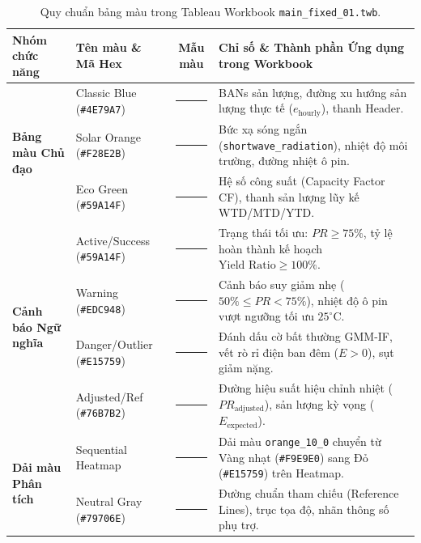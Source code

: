 \documentclass[12pt, a4paper]{report}
\begin{document}
\begin{table}[H]
\centering
\small
\renewcommand{\arraystretch}{1.3}
\begin{tabularx}{\textwidth}{@{} l l c X @{}}
\toprule
\textbf{Nhóm chức năng} & \textbf{Tên màu \& Mã Hex} & \textbf{Mẫu màu} & \textbf{Chỉ số \& Thành phần Ứng dụng trong Workbook} \\
\midrule
\multirow{3}{*}{\textbf{Bảng màu Chủ đạo}} 
& Classic Blue (\texttt{\#4E79A7}) & \textcolor{tblNavy}{\rule{1.2cm}{0.3cm}} & BANs sản lượng, đường xu hướng sản lượng thực tế ($e_{\text{hourly}}$), thanh Header. \\
& Solar Orange (\texttt{\#F28E2B}) & \textcolor{tblOrange}{\rule{1.2cm}{0.3cm}} & Bức xạ sóng ngắn (\texttt{shortwave\_radiation}), nhiệt độ môi trường, đường nhiệt ô pin. \\
& Eco Green (\texttt{\#59A14F}) & \textcolor{tblGreen}{\rule{1.2cm}{0.3cm}} & Hệ số công suất (Capacity Factor CF), thanh sản lượng lũy kế WTD/MTD/YTD. \\
\midrule
\multirow{4}{*}{\textbf{Cảnh báo Ngữ nghĩa}}
& Active/Success (\texttt{\#59A14F}) & \textcolor{tblGreen}{\rule{1.2cm}{0.3cm}} & Trạng thái tối ưu: $PR \ge 75\%$, tỷ lệ hoàn thành kế hoạch $\text{Yield Ratio} \ge 100\%$. \\
& Warning (\texttt{\#EDC948}) & \textcolor{tblYellow}{\rule{1.2cm}{0.3cm}} & Cảnh báo suy giảm nhẹ ($50\% \le PR < 75\%$), nhiệt độ ô pin vượt ngưỡng tối ưu $25^\circ\text{C}$. \\
& Danger/Outlier (\texttt{\#E15759}) & \textcolor{tblRed}{\rule{1.2cm}{0.3cm}} & Đánh dấu cờ bất thường GMM-IF, vết rò rỉ điện ban đêm ($E > 0$), sụt giảm nặng. \\
& Adjusted/Ref (\texttt{\#76B7B2}) & \textcolor{tblTeal}{\rule{1.2cm}{0.3cm}} & Đường hiệu suất hiệu chỉnh nhiệt ($PR_{\text{adjusted}}$), sản lượng kỳ vọng ($E_{\text{expected}}$). \\
\midrule
\multirow{2}{*}{\textbf{Dải màu Phân tích}}
& Sequential Heatmap & \textcolor{tblSeqWarm}{\rule{1.2cm}{0.3cm}} & Dải màu \texttt{orange\_10\_0} chuyển từ Vàng nhạt (\texttt{\#F9E9E0}) sang Đỏ (\texttt{\#E15759}) trên Heatmap. \\
& Neutral Gray (\texttt{\#79706E}) & \textcolor{tblGray}{\rule{1.2cm}{0.3cm}} & Đường chuẩn tham chiếu (Reference Lines), trục tọa độ, nhãn thông số phụ trợ. \\
\bottomrule
\end{tabularx}
\caption{Quy chuẩn bảng màu trong Tableau Workbook \texttt{main\_fixed\_01.twb}.}
\label{tab:tableau_color_system}
\end{table}
\end{document}
